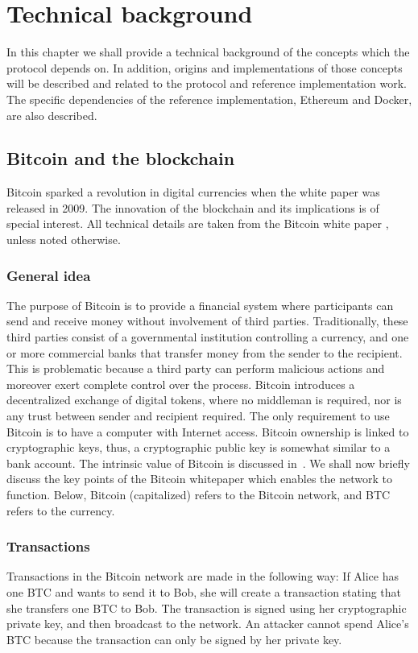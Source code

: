 \chapter{Technical background}
In this chapter we shall provide a technical background of the concepts which the protocol depends on. In addition, origins and implementations of those concepts will be described and related to the protocol and reference implementation work. The specific dependencies of the reference implementation, Ethereum and Docker, are also described.

\section{Bitcoin and the blockchain}
Bitcoin sparked a revolution in digital currencies when the white paper was released in 2009. The innovation of the blockchain and its implications is of special interest. All technical details are taken from the Bitcoin white paper \cite{btc}, unless noted otherwise.

\subsection{General idea}
The purpose of Bitcoin is to provide a financial system where participants can send and receive money without involvement of third parties. Traditionally, these third parties consist of a governmental institution controlling a currency, and one or more commercial banks that transfer money from the sender to the recipient. This is problematic because a third party can perform malicious actions and moreover exert complete control over the process. Bitcoin introduces a decentralized exchange of digital tokens, where no middleman is required, nor is any trust between sender and recipient required. The only requirement to use Bitcoin is to have a computer with Internet access. Bitcoin ownership is linked to cryptographic keys, thus, a cryptographic public key is somewhat similar to a bank account. The intrinsic value of Bitcoin is discussed in~\cite{buterin:2011}. We shall now briefly discuss the key points of the Bitcoin whitepaper which enables the network to function. Below, Bitcoin (capitalized) refers to the Bitcoin network, and BTC refers to the currency.

\subsection{Transactions}
Transactions in the Bitcoin network are made in the following way: If Alice has one BTC and wants to send it to Bob, she will create a transaction stating that she transfers one BTC to Bob. The transaction is signed using her cryptographic private key, and then broadcast to the network. An attacker cannot spend Alice's BTC because the transaction can only be signed by her private key.

